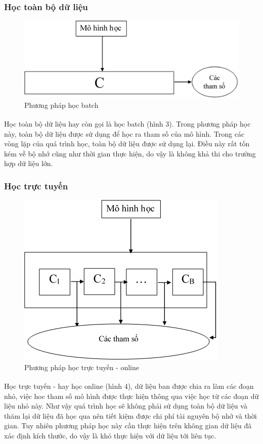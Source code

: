 \documentclass[fontsize=13pt]{scrartcl}
\begin{document}
\subsubsection{Học toàn bộ dữ liệu}
\begin{figure}[h]
\begin{center}
\includegraphics[scale=0.7]{img/batch.png}
\end{center}
\label{fig:batchLearning}
\caption{Phương pháp học batch}
\end{figure}
Học toàn bộ dữ liệu hay còn gọi là học batch\textsuperscript{\cite{blei2003latent}} (hình 3). Trong phương pháp học này, toàn bộ dữ liệu được sử dụng để học ra tham số của mô hình. Trong các vòng lặp của quá trình học, toàn bộ dữ liệu được sử dụng lại. Điều này rất tốn kém về bộ nhớ cũng như thời gian thực hiện, do vậy là không khả thi cho trường hợp dữ liệu lớn.
\subsubsection{Học trực tuyến}
\begin{figure}[h]
\begin{center}
\includegraphics[scale=0.7]{img/online.png}
\end{center}
\label{fig:onlineLearning}
\caption{Phương pháp học trực tuyến - online}
\end{figure}
Học trực tuyến - hay học online\textsuperscript{\cite{onlineLDA}} (hình 4), dữ liệu ban được chia ra làm các đoạn nhỏ, việc hoc tham số mô hình được thực hiện thông qua việc học từ các đoạn dữ liệu nhỏ này. Như vậy quá trình học sẽ không phải sử dụng toàn bộ dữ liệu và thăm lại dữ liệu đã học qua nên tiết kiệm được chi phí tài nguyên bộ nhớ và thời gian. Tuy nhiên phương pháp học này cần thực hiện trên không gian dữ liệu đã xác định kích thước, do vậy là khó thực hiện với dữ liệu tới liên tục.
\end{document}
